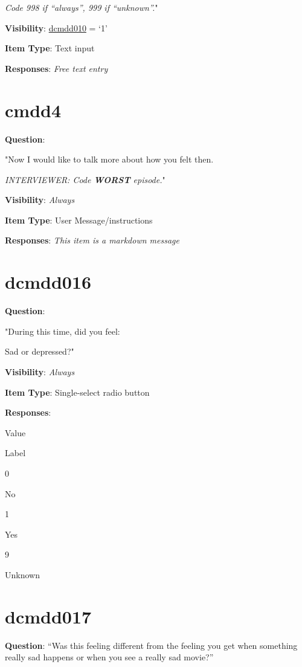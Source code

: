 \documentclass[]{book}
\begin{document}
\emph{Code 998 if ``always'', 999 if ``unknown''.}"

\textbf{Visibility}: \protect\hyperlink{dcmdd010}{dcmdd010} = `1'

\textbf{Item Type}: Text input

\textbf{Responses}: \emph{Free text entry}

\hypertarget{cmdd4}{%
\section{cmdd4}\label{cmdd4}}

\textbf{Question}:

"Now I would like to talk more about how you felt then.

\emph{INTERVIEWER: Code \textbf{WORST} episode.}"

\textbf{Visibility}: \emph{Always}

\textbf{Item Type}: User Message/instructions

\textbf{Responses}: \emph{This item is a markdown message}

\hypertarget{dcmdd016}{%
\section{dcmdd016}\label{dcmdd016}}

\textbf{Question}:

"During this time, did you feel:

Sad or depressed?"

\textbf{Visibility}: \emph{Always}

\textbf{Item Type}: Single-select radio button

\textbf{Responses}:

Value

Label

0

No

1

Yes

9

Unknown

\hypertarget{dcmdd017}{%
\section{dcmdd017}\label{dcmdd017}}

\textbf{Question}: ``Was this feeling different from the feeling you get when something really sad happens or when you see a really sad movie?''
\end{document}
